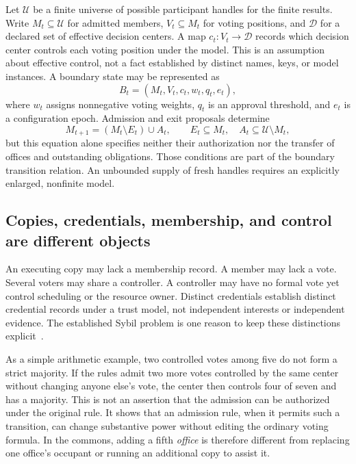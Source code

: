 \documentclass[11pt,letterpaper]{article}
\theoremstyle{plain}
\theoremstyle{definition}
\theoremstyle{remark}
\begin{document}
Let $\mathcal U$ be a finite universe of possible participant handles for the finite results. Write $M_t\subseteq\mathcal U$ for admitted members, $V_t\subseteq M_t$ for voting positions, and $\mathcal D$ for a declared set of effective decision centers. A map $c_t:V_t\to\mathcal D$ records which decision center controls each voting position under the model. This is an assumption about effective control, not a fact established by distinct names, keys, or model instances. A boundary state may be represented as
\[
B_t=(M_t,V_t,c_t,w_t,q_t,e_t),
\]
where $w_t$ assigns nonnegative voting weights, $q_t$ is an approval threshold, and $e_t$ is a configuration epoch. Admission and exit proposals determine
\[
M_{t+1}=(M_t\setminus E_t)\cup A_t,
\qquad E_t\subseteq M_t,\quad A_t\subseteq\mathcal U\setminus M_t,
\]
but this equation alone specifies neither their authorization nor the transfer of offices and outstanding obligations. Those conditions are part of the boundary transition relation. An unbounded supply of fresh handles requires an explicitly enlarged, nonfinite model.

\subsection{Copies, credentials, membership, and control are different objects}
An executing copy may lack a membership record. A member may lack a vote. Several voters may share a controller. A controller may have no formal vote yet control scheduling or the resource owner. Distinct credentials establish distinct credential records under a trust model, not independent interests or independent evidence. The established Sybil problem is one reason to keep these distinctions explicit~\cite{douceur}.

As a simple arithmetic example, two controlled votes among five do not form a strict majority. If the rules admit two more votes controlled by the same center without changing anyone else's vote, the center then controls four of seven and has a majority. This is not an assertion that the admission can be authorized under the original rule. It shows that an admission rule, when it permits such a transition, can change substantive power without editing the ordinary voting formula. In the commons, adding a fifth \emph{office} is therefore different from replacing one office's occupant or running an additional copy to assist it.
\end{document}
